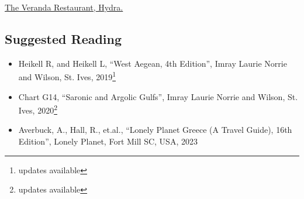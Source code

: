\href{https://www.hydra.com.gr/veranda-restaurant/en-index.html}{The Veranda Restaurant, Hydra.}

\subsection*{Suggested Reading}
\begin{itemize}
\item Heikell R, and Heikell L, ``West Aegean, 4th Edition'', Imray Laurie Norrie and Wilson, St. Ives, 2019\footnote{updates available}
\item Chart G14, ``Saronic and Argolic Gulfs'', Imray Laurie Norrie and Wilson, St. Ives, 2020\footnote{updates available}
\item Averbuck, A., Hall, R., et.al., ``Lonely Planet Greece (A Travel Guide), 16th Edition'', Lonely Planet, Fort Mill SC, USA, 2023
\end{itemize}